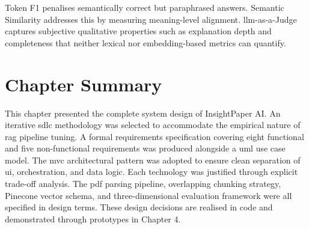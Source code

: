 Token F1 penalises semantically correct but paraphrased answers. Semantic Similarity addresses this by measuring meaning-level alignment. \gls{llm}-as-a-Judge captures subjective qualitative properties such as explanation depth and completeness that neither lexical nor embedding-based metrics can quantify.

\section{Chapter Summary}

This chapter presented the complete system design of InsightPaper AI. An iterative \gls{sdlc} methodology was selected to accommodate the empirical nature of \gls{rag} pipeline tuning. A formal requirements specification covering eight functional and five non-functional requirements was produced alongside a \gls{uml} use case model. The \gls{mvc} architectural pattern was adopted to ensure clean separation of \gls{ui}, orchestration, and data logic. Each technology was justified through explicit trade-off analysis. The \gls{pdf} parsing pipeline, overlapping chunking strategy, Pinecone vector schema, and three-dimensional evaluation framework were all specified in design terms. These design decisions are realised in code and demonstrated through prototypes in Chapter 4.
